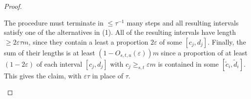 \documentclass{amsart}
\newcommand{\eps}{\varepsilon}
\newcommand{\tc}{\tilde{c}}
\newcommand{\td}{\tilde{d}}
\begin{document}
\begin{proof}
\begin{itemize}
   The procedure must terminate in $\le \tau^{-1}$ many steps and all resulting intervals satisfy one of the alternatives in (1). All of the resulting intervals have length $\ge 2\eps \tau m$, since they contain a least a proportion $2\eps$ of some $[c_j, d_j]$. Finally, the sum of their lengths is at least $(1 - O_{s,t,u} (\eps)) m$ since a proportion of at least $(1-2\eps)$ of each interval $[c_j, d_j]$ with $c_j \ge_{s,t} \eps m$ is contained in some $[\tc_i, \td_i]$. This gives the claim, with $\eps \tau$ in place of $\tau$.
    \end{itemize}
    
\end{proof}
\end{document}
